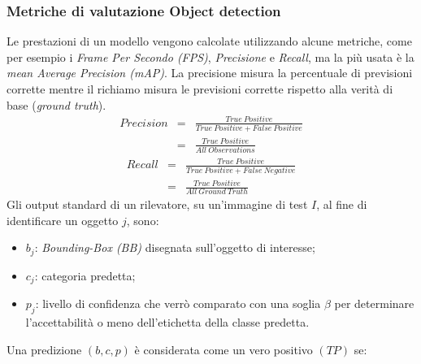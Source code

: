 \subsubsection{Metriche di valutazione Object detection}
Le prestazioni di un modello vengono calcolate utilizzando alcune metriche, come 
per esempio i \emph{Frame Per Secondo (FPS)}, \emph{Precisione} e \emph{Recall}, ma la più usata è la 
\emph{mean Average Precision (mAP)}. La precisione misura la percentuale di previsioni 
corrette mentre il richiamo misura le previsioni corrette rispetto alla verità 
di base (\emph{ground truth}).
\begin{eqnarray}\label{precision}
    Precision & = & \frac{True \ Positive}{True \ Positive + False \ Positive} \nonumber \\
             & = & \frac{True \ Positive}{All \ Observations}
\end{eqnarray}
\begin{eqnarray}\label{recall}
    Recall & = & \frac{True \ Positive}{True \ Positive + False \ Negative} \nonumber \\
             & = & \frac{True \ Positive}{All \ Ground \ Truth}
\end{eqnarray}
Gli output standard di un rilevatore, su un’immagine di test $I$, al fine di 
identificare un oggetto $j$, sono:
\begin{itemize}
    \item $b_j$: \emph{Bounding-Box (BB)} disegnata sull’oggetto di interesse;
    \item $c_j$: categoria predetta;
    \item $p_j$: livello di confidenza che verrò comparato con una soglia $\beta$ per determinare 
    l’accettabilità o meno dell’etichetta della classe predetta. 
\end{itemize}
Una predizione $(b,c,p)$ è considerata come un vero positivo $(TP)$ se:
